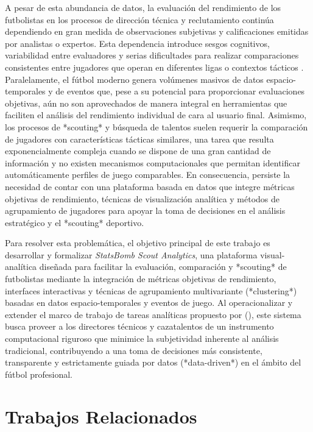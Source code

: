 \documentclass[conference]{IEEEtran}
\begin{document}
A pesar de esta abundancia de datos, la evaluación del rendimiento de los futbolistas en los procesos de dirección técnica y reclutamiento continúa dependiendo en gran medida de observaciones subjetivas y calificaciones emitidas por analistas o expertos. Esta dependencia introduce sesgos cognitivos, variabilidad entre evaluadores y serias dificultades para realizar comparaciones consistentes entre jugadores que operan en diferentes ligas o contextos tácticos \citep{hvattum2019comprehensive, evers2024visual}. Paralelamente, el fútbol moderno genera volúmenes masivos de datos espacio-temporales y de eventos que, pese a su potencial para proporcionar evaluaciones objetivas, aún no son aprovechados de manera integral en herramientas que faciliten el análisis del rendimiento individual de cara al usuario final. Asimismo, los procesos de *scouting* y búsqueda de talentos suelen requerir la comparación de jugadores con características tácticas similares, una tarea que resulta exponencialmente compleja cuando se dispone de una gran cantidad de información y no existen mecanismos computacionales que permitan identificar automáticamente perfiles de juego comparables. En consecuencia, persiste la necesidad de contar con una plataforma basada en datos que integre métricas objetivas de rendimiento, técnicas de visualización analítica y métodos de agrupamiento de jugadores para apoyar la toma de decisiones en el análisis estratégico y el *scouting* deportivo.

Para resolver esta problemática, el objetivo principal de este trabajo es desarrollar y formalizar \textit{StatsBomb Scout Analytics}, una plataforma visual-analítica diseñada para facilitar la evaluación, comparación y *scouting* de futbolistas mediante la integración de métricas objetivas de rendimiento, interfaces interactivas y técnicas de agrupamiento multivariante (*clustering*) basadas en datos espacio-temporales y eventos de juego. Al operacionalizar y extender el marco de trabajo de tareas analíticas propuesto por \citeauthor{evers2024visual} (\citeyear{evers2024visual}), este sistema busca proveer a los directores técnicos y cazatalentos de un instrumento computacional riguroso que minimice la subjetividad inherente al análisis tradicional, contribuyendo a una toma de decisiones más consistente, transparente y estrictamente guiada por datos (*data-driven*) en el ámbito del fútbol profesional.


\section{Trabajos Relacionados}
\end{document}
